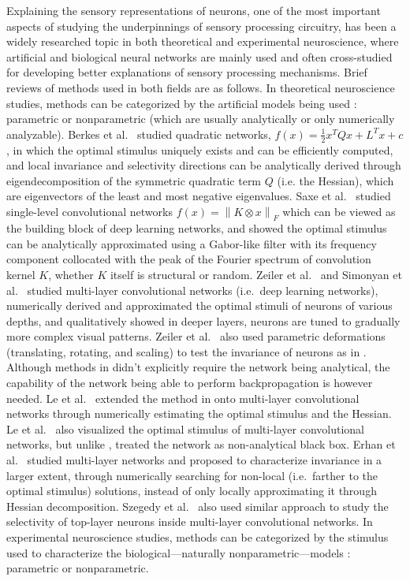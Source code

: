 Explaining the sensory representations of neurons, one of the most important aspects of studying the underpinnings of sensory processing circuitry, has been a widely researched topic in both theoretical and experimental neuroscience, where artificial and biological neural networks are mainly used and often cross-studied for developing better explanations of sensory processing mechanisms. Brief reviews of methods used in both fields are as follows. In theoretical neuroscience studies, methods can be categorized by the artificial models being used \cite{wu2006complete}: parametric or nonparametric (which are usually analytically or only numerically analyzable). Berkes et al.~\cite{berkes2006analysis} studied quadratic networks, $f\left(x\right) = \frac{1}{2}x^{T}Qx+L^{T}x+c$, in which the optimal stimulus uniquely exists and can be efficiently computed, and local invariance and selectivity directions can be analytically derived through eigendecomposition of the symmetric quadratic term $Q$ (i.e. the Hessian), which are eigenvectors of the least and most negative eigenvalues. Saxe et al.~\cite{saxe2011random} studied single-level convolutional networks $f(x) = \left\| K \otimes x \right\|_{F}$ which can be viewed as the building block of deep learning networks, and showed the optimal stimulus can be analytically approximated using a Gabor-like filter with its frequency component collocated with the peak of the Fourier spectrum of convolution kernel $K$, whether $K$ itself is structural or random. Zeiler et al.~\cite{zeiler2014visualizing} and Simonyan et al.~\cite{simonyan2013deep} studied multi-layer convolutional networks (i.e.~deep learning networks), numerically derived and approximated the optimal stimuli of neurons of various depths, and qualitatively showed in deeper layers, neurons are tuned to gradually more complex visual patterns. Zeiler et al.~\cite{zeiler2014visualizing} also used parametric deformations (translating, rotating, and scaling) to test the invariance of neurons as in \cite{goodfellow2009measuring}. Although methods in \cite{zeiler2014visualizing, simonyan2013deep} didn't explicitly require the network being analytical, the capability of the network being able to perform backpropagation is however needed. Le et al.~\cite{ngiam2010tiled} extended the method in \cite{berkes2006analysis} onto multi-layer convolutional networks through numerically estimating the optimal stimulus and the Hessian. Le et al.~\cite{le2012building} also visualized the optimal stimulus of multi-layer convolutional networks, but unlike \cite{zeiler2014visualizing, simonyan2013deep}, treated the network as non-analytical black box. Erhan et al.~\cite{erhan2010understanding} studied multi-layer networks and proposed to characterize invariance in a larger extent, through numerically searching for non-local (i.e.~farther to the optimal stimulus) solutions, instead of only locally approximating it through Hessian decomposition. Szegedy et al.~\cite{szegedy2013intriguing} also used similar approach to study the selectivity of top-layer neurons inside multi-layer convolutional networks. In experimental neuroscience studies, methods can be categorized by the stimulus used to characterize the biological---naturally nonparametric---models \cite{wu2006complete}: parametric or nonparametric. 
